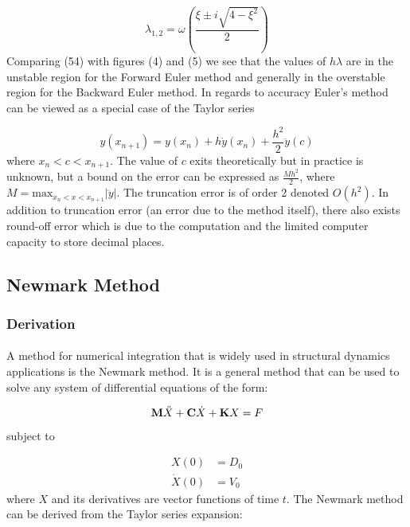 \documentclass{article}
\begin{document}
				\begin{equation}
					\lambda_{1,2} = \omega\left(\frac{\xi \pm i\sqrt{4 - \xi^2}}{2}\right)
				\end{equation}
Comparing (54) with figures (4) and (5) we see that the values of $h\lambda$ are in the unstable region for the Forward Euler method and generally in the overstable region for the Backward Euler method. In regards to accuracy Euler's method can be viewed as a special case of the Taylor series

				\begin{equation}
					y(x_{n+1}) = y(x_{n}) + h\dot{y}(x_{n}) + \frac{h^2}{2}\ddot{y}(c)
				\end{equation}
where $x_{n} < c < x_{n+1}$. The value of $c$ exits theoretically but in practice is unknown, but a bound on the error can be expressed as $\frac{Mh^2}{2}$, where $M = \text{max}_{x_{n} < x < x_{n+1}} |\ddot{y}|$. The truncation error is of order 2 denoted $O(h^2)$. In addition to truncation error (an error due to the method itself), there also exists round-off error which is due to the computation and the limited computer capacity to store decimal places. 


	\subsection{Newmark  Method}

		\subsubsection{Derivation}

			\paragraph{}A method for numerical integration that is widely used in structural dynamics applications is the Newmark method. It is a general method that can be used to solve any system of differential equations of the form:

				\begin{equation}
					\\
					\textbf{M}\ddot{X}+\textbf{C}\dot{X}+\textbf{K}X =F
					\\
				\end{equation}
subject to 

				\begin{align*}
					X(0)&=D_0\\
					\dot{X}(0)&=V_0
				\end{align*}
where $X$ and its derivatives are vector functions of time $t$. The Newmark method can be derived from the Taylor series expansion:
\end{document}
